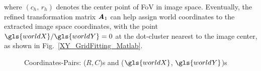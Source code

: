 \noindent
where \((c_h, \, r_h)\) denotes the center point of \gls{FoV} in image space. Eventually, the refined transformation matrix $\textbf{\textit{A}}_1$ can help assign world coordinates to the extracted image space coordinates, with the point \(\gls{worldX}/\gls{worldY}=0\) at the dot-cluster nearest to the image center, as shown in Fig.~\ref{XY_GridFitting_Matlab}.
%
 \begin{figure}[t]
\hspace*{-0.3cm}
\centering
{}
{}
%
\caption{Coordinates-Pairs: (\(R, C\))s and (\(\gls{worldX}\), \(\gls{worldY}\))s}
\label{Grid_Fitting}
\end{figure}%

